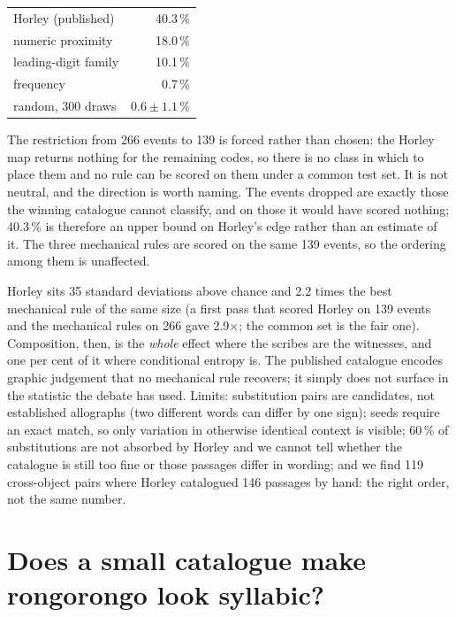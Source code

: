 \documentclass[11pt,a4paper]{article}
\begin{document}
\begin{center}\small
\begin{tabular}{lr}
\toprule
Horley (published) & 40.3\,\% \\
numeric proximity & 18.0\,\% \\
leading-digit family & 10.1\,\% \\
frequency & 0.7\,\% \\
random, 300 draws & $0.6 \pm 1.1$\,\% \\
\bottomrule
\end{tabular}
\end{center}

The restriction from 266 events to 139 is forced rather than chosen: the Horley map returns nothing for the remaining codes, so there is no class in which to place them and no rule can be scored on them under a common test set. It is not neutral, and the direction is worth naming. The events dropped are exactly those the winning catalogue cannot classify, and on those it would have scored nothing; 40.3\,\% is therefore an upper bound on Horley's edge rather than an estimate of it. The three mechanical rules are scored on the same 139 events, so the ordering among them is unaffected.

Horley sits 35 standard deviations above chance and 2.2 times the best mechanical rule of the same size (a first pass that scored Horley on 139 events and the mechanical rules on 266 gave 2.9$\times$; the common set is the fair one). Composition, then, is the \emph{whole} effect where the scribes are the witnesses, and one per cent of it where conditional entropy is. The published catalogue encodes graphic judgement that no mechanical rule recovers; it simply does not surface in the statistic the debate has used. Limits: substitution pairs are candidates, not established allographs (two different words can differ by one sign); seeds require an exact match, so only variation in otherwise identical context is visible; 60\,\% of substitutions are not absorbed by Horley and we cannot tell whether the catalogue is still too fine or those passages differ in wording; and we find 119 cross-object pairs where Horley catalogued 146 passages by hand: the right order, not the same number.

\section{Does a small catalogue make rongorongo look syllabic?}
\label{sec:syllabary}
\end{document}
